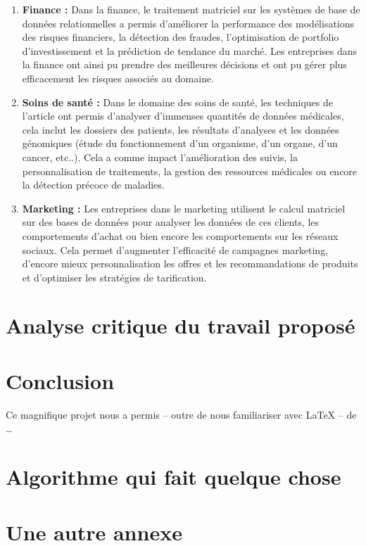 \documentclass[a4paper, 12pt]{article}
\begin{document}
\begin{enumerate}[label={-}]
	\item \textbf{Finance :} Dans la finance, le traitement matriciel sur les systèmes de base de données relationnelles a permis d'améliorer la performance des modélisations des risques financiers, la détection des fraudes, l'optimisation de portfolio d'investissement et la prédiction de tendance du marché. Les entreprises dans la finance ont ainsi pu prendre des meilleures décisions et ont pu gérer plus efficacement les risques associés au domaine.
	\item \textbf{Soins de santé :} Dans le domaine des soins de santé, les techniques de l'article ont permis d'analyser d'immenses quantités de données médicales, cela inclut les dossiers des patients, les résultats d'analyses et les données génomiques (étude du fonctionnement d'un organisme, d'un organe, d'un cancer, etc..). Cela a comme impact l'amélioration des suivis, la personnalisation de traitements, la gestion des ressources médicales ou encore la détection précoce de maladies.
	\item \textbf{Marketing :} Les entreprises dans le marketing utilisent le calcul matriciel sur des bases de données pour analyser les données de ces clients, les comportements d'achat ou bien encore les comportements sur les réseaux sociaux. Cela permet d'augmenter l'efficacité de campagnes marketing, d'encore mieux personnalisation les offres et les recommandations de produits et d'optimiser les stratégies de tarification.
\end{enumerate}


\clearpage 
\section{Analyse critique du travail proposé}

\clearpage 
\section*{Conclusion}

Ce magnifique projet nous a permis -- outre de nous familiariser avec \LaTeX{} -- de \ldots

\clearpage 




\clearpage 
\appendix
\bigskip{}
\section{Algorithme qui fait quelque chose}


\clearpage 
\section{Une autre annexe}
\cite{DH76}
\end{document}
